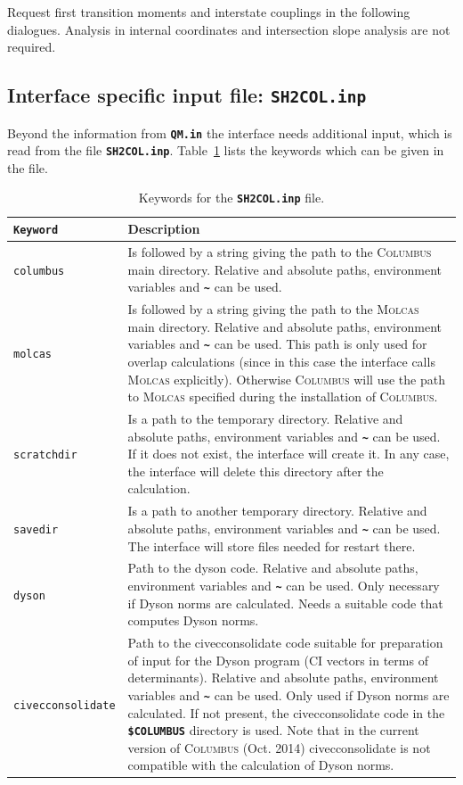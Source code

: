 \documentclass[a4paper,11pt,DIV=15,openany,twoside=false]{scrbook}
\newcommand{\ttt}[1]{\textbf{\texttt{#1}}}
\begin{document}
Request first transition moments and interstate couplings in the following dialogues. Analysis in internal coordinates and intersection slope analysis are not required.

\subsection{Interface specific input file: \ttt{SH2COL.inp}}

Beyond the information from \ttt{QM.in} the interface needs additional input, which is read from the file \ttt{SH2COL.inp}. Table~\ref{tab:columbus_sh2} lists the keywords which can be given in the file.

\begin{table}
  \centering
  \caption{Keywords for the \ttt{SH2COL.inp} file.}
  \label{tab:columbus_sh2}
  \begin{tabular}{>{\tt}lp{12cm}}
  \toprule
  Keyword       &Description\\
  \midrule
columbus        &Is followed by a string giving the path to the \textsc{Columbus} main directory. Relative and absolute paths, environment variables and \ttt{\textasciitilde} can be used.\\
molcas          &Is followed by a string giving the path to the \textsc{Molcas} main directory.  Relative and absolute paths, environment variables and \ttt{\textasciitilde} can be used. This path is only used for overlap calculations (since in this case the interface calls \textsc{Molcas} explicitly). Otherwise \textsc{Columbus} will use the path to \textsc{Molcas} specified during the installation of \textsc{Columbus}.\\
scratchdir      &Is a path to the temporary directory. Relative and absolute paths, environment variables and \ttt{\textasciitilde} can be used. If it does not exist, the interface will create it. In any case, the interface will delete this directory after the calculation.\\
savedir         &Is a path to another temporary directory.  Relative and absolute paths, environment variables and \ttt{\textasciitilde} can be used. The interface will store files needed for restart there.\\
dyson           &Path to the dyson code. Relative and absolute paths, environment variables and \ttt{\textasciitilde} can be used. Only necessary if Dyson norms are calculated. Needs a suitable code that computes Dyson norms.\\
civecconsolidate&Path to the civecconsolidate code suitable for preparation of input for the Dyson program (CI vectors in terms of determinants). Relative and absolute paths, environment variables and \ttt{\textasciitilde} can be used. Only used if Dyson norms are calculated. If not present, the civecconsolidate code in the \ttt{\$COLUMBUS} directory is used. Note that in the current version of \textsc{Columbus} (Oct. 2014) civecconsolidate is not compatible with the calculation of Dyson norms.\\

\end{tabular}
\end{table}
\end{document}
